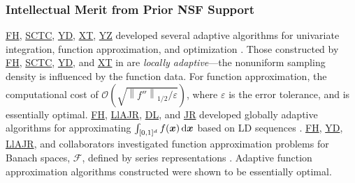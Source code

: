 \documentclass[11pt]{NSFamsart}
\newcommand{\FH}{\hyperlink{FHlink}{FH}\xspace}
\newcommand{\SCTC}{\hyperlink{SCTClink}{SCTC}\xspace}
\newcommand{\YD}{\hyperlink{YDlink}{YD}\xspace}
\newcommand{\JR}{\hyperlink{JRlink}{JR}\xspace}
\newcommand{\LlAJR}{\hyperlink{LlAJRlink}{LlAJR}\xspace}
\newcommand{\XT}{\hyperlink{XTlink}{XT}\xspace}
\newcommand{\DL}{\hyperlink{DLlink}{DL}\xspace}
\newcommand{\YZ}{\hyperlink{YZlink}{YZ}\xspace}
\newcommand{\bx}{{\boldsymbol{x}}}
\def\dif{\textup{d}}
\newcommand{\calf}{{\mathcal{F}}}
\def\abs#1{\ensuremath{\left \lvert #1 \right \rvert}}
\newcommand{\norm}[2][{}]{\ensuremath{\left \lVert #2 \right \rVert}_{#1}}
\newcommand{\Order}{\mathcal{O}}
\begin{document}
\subsubsection{Intellectual Merit from Prior NSF Support}
\label{previousmeritsubsec}

\FH, \SCTC, \YD, \XT, \YZ developed several adaptive algorithms for univariate integration, function approximation, and optimization \cite{ChoEtal17a,HicEtal14b,  Din15a, Ton14a, Zha18a}.  Those constructed by \FH, \SCTC, \YD, and \XT in \cite{ChoEtal17a} are \emph{locally adaptive}---the nonuniform sampling density is influenced by the function data.  For function approximation, the computational cost of $\Order\left(\sqrt{\norm[1/2]{f''}/\varepsilon} \right)$, where $\varepsilon$ is the error tolerance, and is essentially optimal. 
\FH, \LlAJR, \DL, and \JR developed globally adaptive algorithms for approximating $\int_{[0,1]^d} f(\bx) \, \dif \bx$ based on LD sequences \cite{HicJim16a,HicEtal17a,JimHic16a}. 
\FH, \YD, \LlAJR, and collaborators investigated function approximation problems for Banach spaces, $\calf$, defined by series representations \cite{DinHic20a,DinEtal20a}.  Adaptive function approximation algorithms constructed were shown to be essentially optimal.


\end{document}
